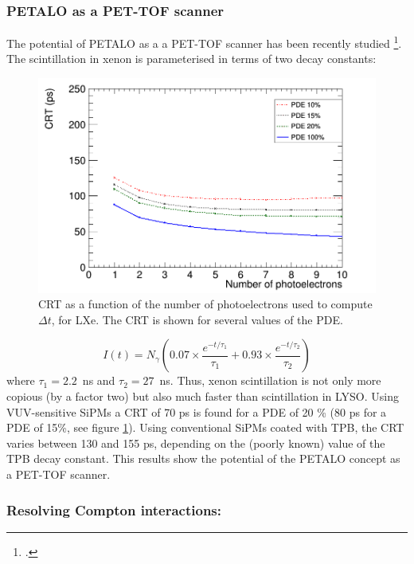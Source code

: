 \subsubsection*{PETALO as a PET-TOF scanner}
The potential of PETALO as a a PET-TOF scanner has been recently studied \footcite{PetaloTOF}. The scintillation in xenon is parameterised in terms of two decay constants:

 \begin{figure}[!bhtp]
	\centering
	\includegraphics[scale=0.40]{img/lxe_noCher_avg_npe_phys.png}
	\caption{\label{fig.crt_avg_LXe} CRT as a function of the number of photoelectrons used to compute $\Delta t$, for LXe. The CRT is shown for several values of the PDE.}
\end{figure}

\begin{equation}
I(t) = N_\gamma (0.07 \times \frac{e^{-t/\tau_1}}{\tau_1} + 0.93 \times \frac{e^{-t/\tau_2}}{\tau_2})
\label{eq.scint}
\end{equation}
where $\tau_1 = 2.2$~ns and $\tau_2 = 27$~ns. Thus, xenon scintillation is not only more copious (by a factor two) but also much faster than scintillation in LYSO. Using VUV-sensitive SiPMs a CRT of 70 ps is found for a PDE of 20 \% (80 ps for a PDE of 15\%, see figure \ref{fig.crt_avg_LXe}). Using conventional SiPMs coated with TPB, the CRT varies between 130 and 155 ps, depending on the (poorly known) value of the TPB decay constant. This results show the
potential of the PETALO concept as a PET-TOF scanner.  

\subsubsection*{Resolving Compton interactions:}

